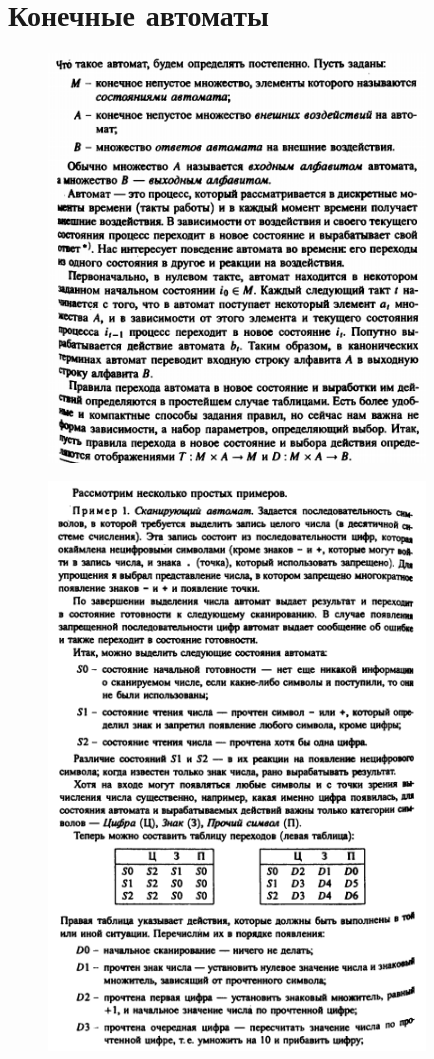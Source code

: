 \documentclass[discrete.tex]{subfiles}
\begin{document}
  \section{Конечные автоматы}

  \begin{figure}[H]
          \includegraphics[width=10cm]{pics/59_1}
          \centering
  \end{figure}

  \begin{figure}[H]
          \includegraphics[width=10cm]{pics/59_2}
          \centering
  \end{figure}
\end{document}
